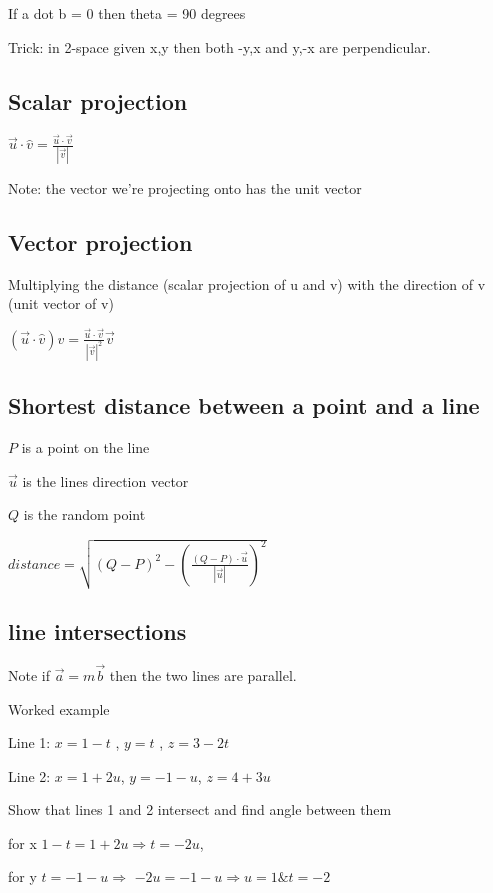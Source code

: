 \documentclass{extarticle}
\begin{document}
If a dot b = 0 then theta = 90 degrees

Trick: in 2-space given x,y then both -y,x and y,-x are perpendicular.

\subsection{Scalar projection}

$\vec{u}\cdot\hat{v}=\frac{\vec{u}\cdot\vec{v}}{\left|\vec{v}\right|}$

Note: the vector we're projecting onto has the unit vector


\subsection{Vector projection}

Multiplying the distance (scalar projection of u and v) with the direction of v (unit vector of v)

$\left(\vec{u}\cdot\hat{v}\right)\hat{v}=\frac{\vec{u}\cdot\vec{v}}{\left|\vec{v}\right|^2}\vec{v}$

\subsection{Shortest distance between a point and a line}

$P$ is a point on the line

$\vec{u}$ is the lines direction vector

$Q$ is the random point

$distance=\sqrt{(Q-P)^2-  (\frac{(Q-P)\cdot\vec{u}}{\left|\vec{u}\right|})^2}$


\subsection{line intersections}
Note if $\vec{a} = m\vec{b}$ then the two lines are parallel.


Worked example

Line 1: $x=1-t$ , $y=t$ , $z=3-2t$

Line 2: $x=1+2u$, $y=-1-u$, $z=4+3u$

Show that lines 1 and 2 intersect and find angle between them

for x $1-t =1+2u \Rightarrow t =-2u$,

for y $t =-1-u \Rightarrow$ $ -2u=-1-u \Rightarrow u=1 \& t =-2$
\end{document}
